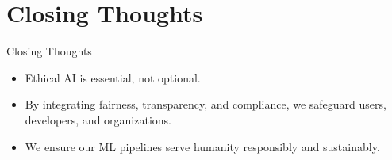 \documentclass[aspectratio=169]{beamer}
\begin{document}
\section{Closing Thoughts}

\begin{frame}{Closing Thoughts}
\begin{itemize}
\item Ethical AI is essential, not optional.
\item By integrating fairness, transparency, and compliance, we safeguard users, developers, and organizations.
\item We ensure our ML pipelines serve humanity responsibly and sustainably.
\end{itemize}
\end{frame}
\end{document}
